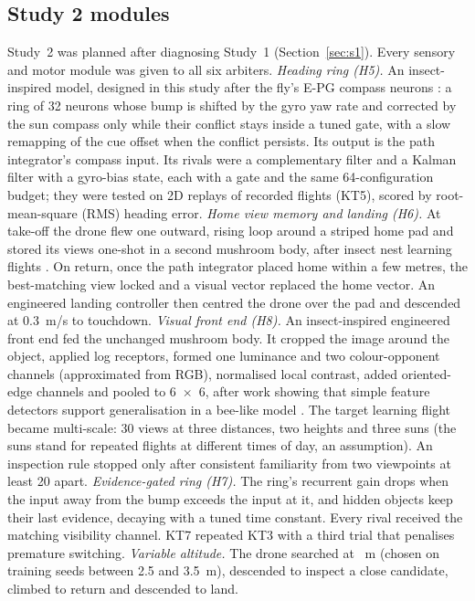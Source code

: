 \documentclass[10pt,twocolumn]{article}
\begin{document}
\subsection{Study 2 modules}
Study~2 was planned after diagnosing Study~1 (Section~\ref{sec:s1}). Every sensory and motor module was given to all six arbiters.
\emph{Heading ring (H5).} An insect-inspired model, designed in this study after the fly's E-PG compass neurons \citep{seelig2015,kim2017}: a ring of 32 neurons whose bump is shifted by the gyro yaw rate and corrected by the sun compass only while their conflict stays inside a tuned gate, with a slow remapping of the cue offset when the conflict persists. Its output is the path integrator's compass input. Its rivals were a complementary filter and a Kalman filter with a gyro-bias state, each with a gate and the same 64-configuration budget; they were tested on 2D replays of recorded flights (KT5), scored by root-mean-square (RMS) heading error.
\emph{Home view memory and landing (H6).} At take-off the drone flew one outward, rising loop around a striped home pad and stored its views one-shot in a second mushroom body, after insect nest learning flights \citep{philippides2013,collett2018}. On return, once the path integrator placed home within a few metres, the best-matching view locked and a visual vector replaced the home vector. An engineered landing controller then centred the drone over the pad and descended at 0.3~m/s to touchdown.
\emph{Visual front end (H8).} An insect-inspired engineered front end fed the unchanged mushroom body. It cropped the image around the object, applied log receptors, formed one luminance and two colour-opponent channels (approximated from RGB), normalised local contrast, added oriented-edge channels and pooled to 6~$\times$~6, after work showing that simple feature detectors support generalisation in a bee-like model \citep{roper2017}. The target learning flight became multi-scale: 30 views at three distances, two heights and three suns (the suns stand for repeated flights at different times of day, an assumption). An inspection rule stopped only after consistent familiarity from two viewpoints at least 20\textdegree{} apart.
\emph{Evidence-gated ring (H7).} The ring's recurrent gain drops when the input away from the bump exceeds the input at it, and hidden objects keep their last evidence, decaying with a tuned time constant. Every rival received the matching visibility channel. KT7 repeated KT3 with a third trial that penalises premature switching.
\emph{Variable altitude.} The drone searched at \StwoAltSearch{}~m (chosen on training seeds between 2.5 and 3.5~m), descended to inspect a close candidate, climbed to return and descended to land.
\end{document}
